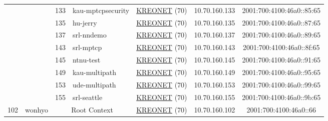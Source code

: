 \begin{small}
\begin{center}
\begin{longtable}{|c|c|c|c|c|c|c|c|}
  &  & \tiny{133} & \multicolumn{1}{|l|}{\tiny{kau-mptcpsecurity}} & \multicolumn{2}{|c|}{\tiny{\href{http://www.kreonet.net}{KREONET} (70)}} & \tiny{10.70.160.133} & \tiny{2001:700:4100:46a0::85:65} \\* \cline{3-3}\cline{4-4}\cline{5-5}\cline{6-6}\cline{7-7}\cline{8-8}
  &  & \tiny{135} & \multicolumn{1}{|l|}{\tiny{hu-jerry}} & \multicolumn{2}{|c|}{\tiny{\href{http://www.kreonet.net}{KREONET} (70)}} & \tiny{10.70.160.135} & \tiny{2001:700:4100:46a0::87:65} \\* \cline{3-3}\cline{4-4}\cline{5-5}\cline{6-6}\cline{7-7}\cline{8-8}
  &  & \tiny{137} & \multicolumn{1}{|l|}{\tiny{srl-nndemo}} & \multicolumn{2}{|c|}{\tiny{\href{http://www.kreonet.net}{KREONET} (70)}} & \tiny{10.70.160.137} & \tiny{2001:700:4100:46a0::89:65} \\* \cline{3-3}\cline{4-4}\cline{5-5}\cline{6-6}\cline{7-7}\cline{8-8}
  &  & \tiny{143} & \multicolumn{1}{|l|}{\tiny{srl-mptcp}} & \multicolumn{2}{|c|}{\tiny{\href{http://www.kreonet.net}{KREONET} (70)}} & \tiny{10.70.160.143} & \tiny{2001:700:4100:46a0::8f:65} \\* \cline{3-3}\cline{4-4}\cline{5-5}\cline{6-6}\cline{7-7}\cline{8-8}
  &  & \tiny{145} & \multicolumn{1}{|l|}{\tiny{ntnu-test}} & \multicolumn{2}{|c|}{\tiny{\href{http://www.kreonet.net}{KREONET} (70)}} & \tiny{10.70.160.145} & \tiny{2001:700:4100:46a0::91:65} \\* \cline{3-3}\cline{4-4}\cline{5-5}\cline{6-6}\cline{7-7}\cline{8-8}
  &  & \tiny{149} & \multicolumn{1}{|l|}{\tiny{kau-multipath}} & \multicolumn{2}{|c|}{\tiny{\href{http://www.kreonet.net}{KREONET} (70)}} & \tiny{10.70.160.149} & \tiny{2001:700:4100:46a0::95:65} \\* \cline{3-3}\cline{4-4}\cline{5-5}\cline{6-6}\cline{7-7}\cline{8-8}
  &  & \tiny{153} & \multicolumn{1}{|l|}{\tiny{ude-multipath}} & \multicolumn{2}{|c|}{\tiny{\href{http://www.kreonet.net}{KREONET} (70)}} & \tiny{10.70.160.153} & \tiny{2001:700:4100:46a0::99:65} \\* \cline{3-3}\cline{4-4}\cline{5-5}\cline{6-6}\cline{7-7}\cline{8-8}
  &  & \tiny{155} & \multicolumn{1}{|l|}{\tiny{srl-seattle}} & \multicolumn{2}{|c|}{\tiny{\href{http://www.kreonet.net}{KREONET} (70)}} & \tiny{10.70.160.155} & \tiny{2001:700:4100:46a0::9b:65} \\ \hline
 \multirow{10}{*}{\tiny{102}} & \multicolumn{1}{|l|}{\multirow{10}{*}{\tiny{wonhyo}}} & \multicolumn{2}{|c|}{\tiny{Root Context}} & \multicolumn{2}{|c|}{\tiny{\href{http://www.kreonet.net}{KREONET} (70)}} & \tiny{10.70.160.102} & \tiny{2001:700:4100:46a0::66} \\* \cline{3-3}\cline{4-4}\cline{5-5}\cline{6-6}\cline{7-7}\cline{8-8}

\end{longtable}
\end{center}
\end{small}
